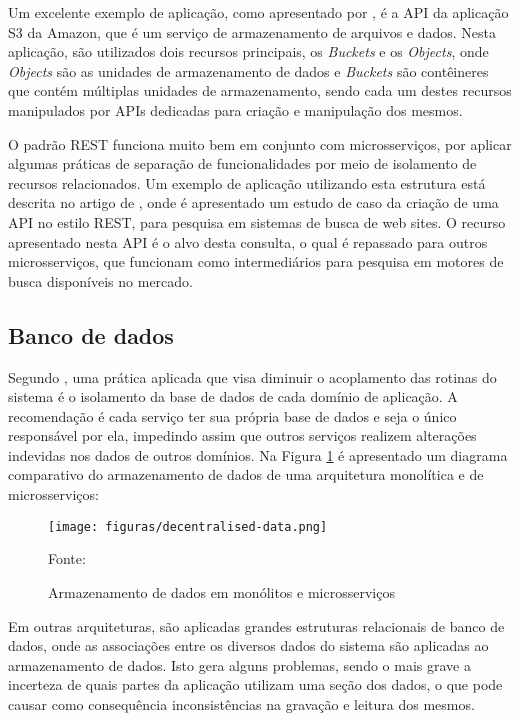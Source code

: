 Um excelente exemplo de aplicação, como apresentado por
, é a \ac{API} da aplicação S3 da Amazon, que é
um serviço de armazenamento de arquivos e dados. Nesta aplicação, são
utilizados dois recursos principais, os \emph{Buckets} e os \emph{Objects},
onde \emph{Objects} são as unidades de armazenamento de dados e \emph{Buckets}
são contêineres que contém múltiplas unidades de armazenamento, sendo cada
um destes recursos manipulados por \acp{API} dedicadas para criação e
manipulação dos mesmos.

O padrão \ac{REST} funciona muito bem em conjunto com microsserviços, por
aplicar algumas práticas de separação de funcionalidades por meio de
isolamento de recursos relacionados. Um exemplo de aplicação utilizando esta
estrutura está descrita no artigo de , onde é
apresentado um estudo de caso da criação de uma \ac{API} no estilo \ac{REST},
para pesquisa em sistemas de busca de web sites. O recurso apresentado nesta
\ac{API} é o alvo desta consulta, o qual é repassado para outros
microsserviços, que funcionam como intermediários para pesquisa em motores
de busca disponíveis no mercado.

\subsection{Banco de dados}

Segundo , uma prática aplicada que visa diminuir o
acoplamento das rotinas do sistema é o isolamento da base de dados de cada
domínio de aplicação. A recomendação é cada serviço ter sua própria base de
dados e seja o único responsável por ela, impedindo assim que outros serviços
realizem alterações indevidas nos dados de outros domínios. Na Figura
\ref{fig:db-monolith-microservices} é apresentado um diagrama comparativo do
armazenamento de dados de uma arquitetura monolítica e de microsserviços:

\begin{figure}[H]
	\centering
	\caption{Armazenamento de dados em monólitos e microsserviços}
	\texttt{[image: figuras/decentralised-data.png]}

	\label{fig:db-monolith-microservices}
	\footnotesize Fonte: 
\end{figure}

Em outras arquiteturas, são aplicadas grandes estruturas relacionais de banco
de dados, onde as associações entre os diversos dados do sistema são
aplicadas ao armazenamento de dados. Isto gera alguns problemas, sendo o mais
grave a incerteza de quais partes da aplicação utilizam uma seção dos dados,
o que pode causar como consequência inconsistências na gravação e leitura
dos mesmos.

